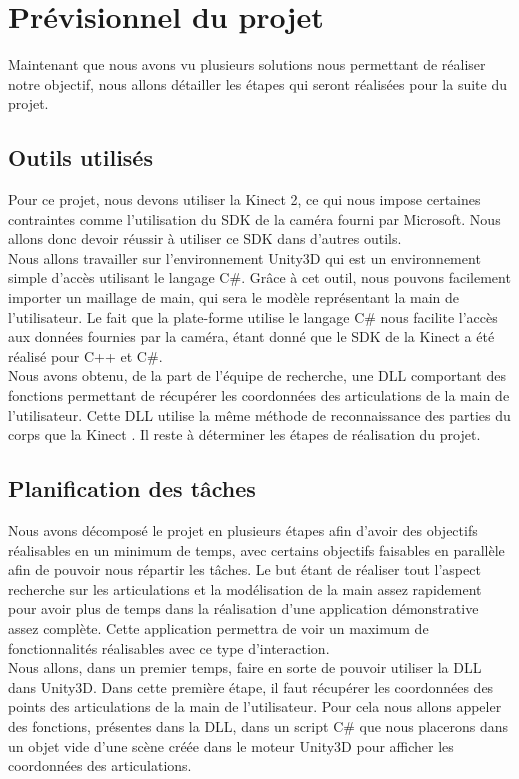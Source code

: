 \chapter{Prévisionnel du projet}
Maintenant que nous avons vu plusieurs solutions nous permettant de réaliser notre 
objectif, nous allons détailler les étapes qui seront réalisées pour la suite du projet.

\section{Outils utilisés}
Pour ce projet, nous devons utiliser la Kinect 2, ce qui nous impose certaines contraintes comme l'utilisation
du SDK de la caméra fourni par Microsoft. Nous allons donc devoir réussir à utiliser ce SDK dans d'autres outils.\\

Nous allons travailler sur l'environnement Unity3D qui est 
un environnement simple d'accès utilisant le langage C\#. Grâce à cet outil, nous pouvons
facilement importer un maillage de main, qui sera le modèle représentant
la main de l'utilisateur. Le fait que la plate-forme utilise le langage C\# nous facilite 
l'accès aux données fournies par la caméra, étant donné que le SDK de la Kinect a été réalisé pour
C++ et C\#.\\

Nous avons obtenu, de la part de l'équipe de recherche, une DLL comportant des fonctions permettant
de récupérer les coordonnées des articulations de la main de l'utilisateur. Cette DLL utilise 
la même méthode de reconnaissance des parties du corps que la Kinect \cite{export:145347}. Il reste à déterminer les 
étapes de réalisation du projet.

\section{Planification des tâches}
Nous avons décomposé le projet en plusieurs étapes afin d'avoir des objectifs réalisables en 
un minimum de temps, avec certains objectifs faisables en parallèle afin de pouvoir nous répartir
les tâches. Le but étant de réaliser tout l'aspect recherche sur les articulations et la modélisation de la main assez rapidement pour 
avoir plus de temps dans la réalisation d'une application démonstrative assez complète. Cette application
permettra de voir un maximum de fonctionnalités réalisables avec ce type d'interaction.\\

Nous allons, dans un premier temps, faire en sorte de pouvoir utiliser la DLL dans Unity3D.
Dans cette première étape, il faut récupérer les coordonnées des points des articulations
de la main de l'utilisateur. Pour cela nous allons appeler des fonctions, présentes dans la DLL, dans un 
script C\# que nous placerons dans un objet vide d'une scène créée dans le moteur Unity3D pour
afficher les coordonnées des articulations.\\

